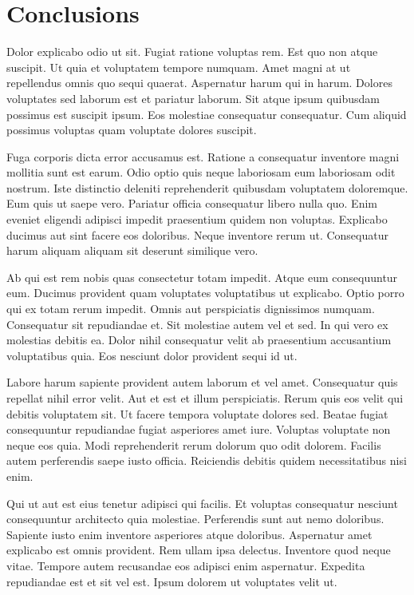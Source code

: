 \chapter{Conclusions\label{conclusions}}


Dolor explicabo odio ut sit. Fugiat ratione voluptas rem. Est quo non atque suscipit. Ut quia et voluptatem tempore numquam. Amet magni at ut repellendus omnis quo sequi quaerat. Aspernatur harum qui in harum. Dolores voluptates sed laborum est et pariatur laborum. Sit atque ipsum quibusdam possimus est suscipit ipsum. Eos molestiae consequatur consequatur. Cum aliquid possimus voluptas quam voluptate dolores suscipit.

Fuga corporis dicta error accusamus est. Ratione a consequatur inventore magni mollitia sunt est earum. Odio optio quis neque laboriosam eum laboriosam odit nostrum. Iste distinctio deleniti reprehenderit quibusdam voluptatem doloremque. Eum quis ut saepe vero. Pariatur officia consequatur libero nulla quo. Enim eveniet eligendi adipisci impedit praesentium quidem non voluptas. Explicabo ducimus aut sint facere eos doloribus. Neque inventore rerum ut. Consequatur harum aliquam aliquam sit deserunt similique vero.

Ab qui est rem nobis quas consectetur totam impedit. Atque eum consequuntur eum. Ducimus provident quam voluptates voluptatibus ut explicabo. Optio porro qui ex totam rerum impedit. Omnis aut perspiciatis dignissimos numquam. Consequatur sit repudiandae et. Sit molestiae autem vel et sed. In qui vero ex molestias debitis ea. Dolor nihil consequatur velit ab praesentium accusantium voluptatibus quia. Eos nesciunt dolor provident sequi id ut.

Labore harum sapiente provident autem laborum et vel amet. Consequatur quis repellat nihil error velit. Aut et est et illum perspiciatis. Rerum quis eos velit qui debitis voluptatem sit. Ut facere tempora voluptate dolores sed. Beatae fugiat consequuntur repudiandae fugiat asperiores amet iure. Voluptas voluptate non neque eos quia. Modi reprehenderit rerum dolorum quo odit dolorem. Facilis autem perferendis saepe iusto officia. Reiciendis debitis quidem necessitatibus nisi enim.

Qui ut aut est eius tenetur adipisci qui facilis. Et voluptas consequatur nesciunt consequuntur architecto quia molestiae. Perferendis sunt aut nemo doloribus. Sapiente iusto enim inventore asperiores atque doloribus. Aspernatur amet explicabo est omnis provident. Rem ullam ipsa delectus. Inventore quod neque vitae. Tempore autem recusandae eos adipisci enim aspernatur. Expedita repudiandae est et sit vel est. Ipsum dolorem ut voluptates velit ut.

